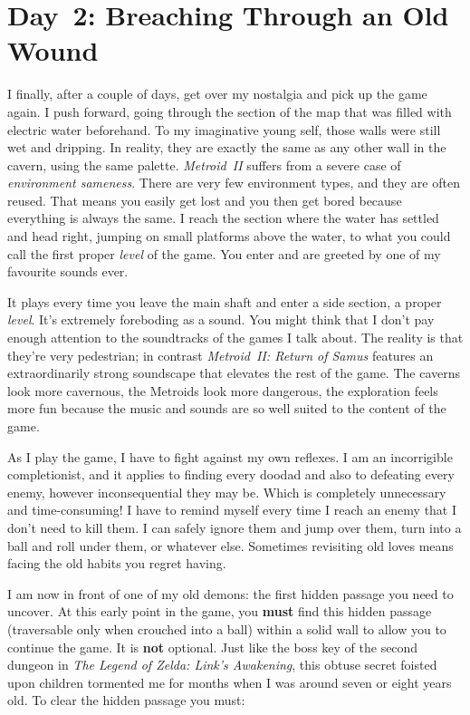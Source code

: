 \documentclass{book}
\begin{document}
\FloatBarrier\needspace{10mm}\section*{Day~2: Breaching Through an Old Wound}\nopagebreak[4]

I finally, after a couple of days, get over my nostalgia and pick up the game again. I push forward, going through the section of the map that was filled with electric water beforehand. To my imaginative young self, those walls were still wet and dripping. In reality, they are exactly the same as any other wall in the cavern, using the same palette. \emph{Metroid~II} suffers from a severe case of \emph{environment sameness}. There are very few environment types, and they are often reused. That means you easily get lost and you then get bored because everything is always the same. I reach the section where the water has settled and head right, jumping on small platforms above the water, to what you could call the first proper \emph{level} of the game. You enter and are greeted by one of my favourite sounds ever.



It plays every time you leave the main shaft and enter a side section, a proper \emph{level}. It’s extremely foreboding as a sound. You might think that I don’t pay enough attention to the soundtracks of the games I talk about. The reality is that they’re very pedestrian; in contrast \emph{Metroid~II: Return of Samus} features an extraordinarily strong soundscape that elevates the rest of the game. The caverns look more cavernous, the Metroids look more dangerous, the exploration feels more fun because the music and sounds are so well suited to the content of the game.

As I play the game, I have to fight against my own reflexes. I am an incorrigible completionist, and it applies to finding every doodad and also to defeating every enemy, however inconsequential they may be. Which is completely unnecessary and time-consuming! I have to remind myself every time I reach an enemy that I don’t need to kill them. I can safely ignore them and jump over them, turn into a ball and roll under them, or whatever else. Sometimes revisiting old loves means facing the old habits you regret having.

I am now in front of one of my old demons: the first hidden passage you need to uncover. At this early point in the game, you \textbf{must} find this hidden passage (traversable only when crouched into a ball) within a solid wall to allow you to continue the game. It is \textbf{not} optional. Just like the boss key of the second dungeon in \emph{The Legend of Zelda: Link’s Awakening}, this obtuse secret foisted upon children tormented me for months when I was around seven or eight years old. To clear the hidden passage you must:
\end{document}
